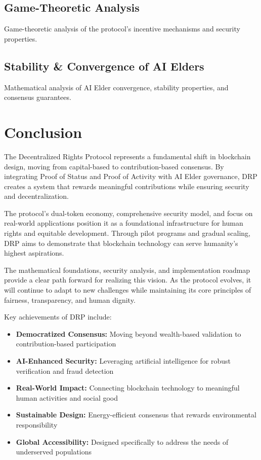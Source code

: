 \documentclass[11pt,a4paper]{article}
\begin{document}
\subsection{Game-Theoretic Analysis}
Game-theoretic analysis of the protocol's incentive mechanisms and security properties.

\subsection{Stability \& Convergence of AI Elders}
Mathematical analysis of AI Elder convergence, stability properties, and consensus guarantees.


\section{Conclusion}

The Decentralized Rights Protocol represents a fundamental shift in blockchain design, moving from capital-based to contribution-based consensus. By integrating Proof of Status and Proof of Activity with AI Elder governance, DRP creates a system that rewards meaningful contributions while ensuring security and decentralization.

The protocol's dual-token economy, comprehensive security model, and focus on real-world applications position it as a foundational infrastructure for human rights and equitable development. Through pilot programs and gradual scaling, DRP aims to demonstrate that blockchain technology can serve humanity's highest aspirations.

The mathematical foundations, security analysis, and implementation roadmap provide a clear path forward for realizing this vision. As the protocol evolves, it will continue to adapt to new challenges while maintaining its core principles of fairness, transparency, and human dignity.

Key achievements of DRP include:
\begin{itemize}
    \item \textbf{Democratized Consensus:} Moving beyond wealth-based validation to contribution-based participation
    \item \textbf{AI-Enhanced Security:} Leveraging artificial intelligence for robust verification and fraud detection
    \item \textbf{Real-World Impact:} Connecting blockchain technology to meaningful human activities and social good
    \item \textbf{Sustainable Design:} Energy-efficient consensus that rewards environmental responsibility
    \item \textbf{Global Accessibility:} Designed specifically to address the needs of underserved populations
\end{itemize}
\end{document}
